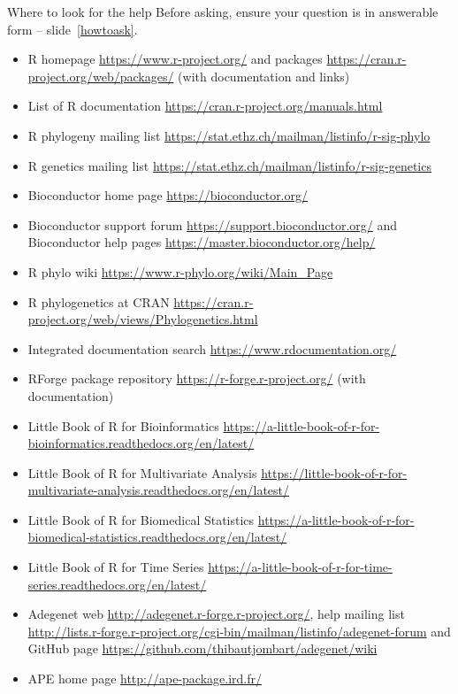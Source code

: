 \documentclass[compress, ucs, xelatex, 11pt, xcolor=svgnames,
  hyperref={
    bookmarks=true,
    unicode=true,
    colorlinks=true,
    pdftitle={Molecular data in R},
    plainpages=false,
    pdfauthor={Vojtech Zeisek},
    pdfsubject={Course about phylogeny and evolution in R},
    pdfcreator={XeLaTeX},
    pdfkeywords={R, evolution, phylogeny, molecular data},
    linkcolor=Tomato,
    anchorcolor=SaddleBrown,
    citecolor=Goldenrod,
    filecolor=DarkMagenta,
    menucolor=Sienna,
    urlcolor=DarkTurquoise,
    pdftex},
  url={hyphens, lowtilde} %
  ]{beamer}
\begin{document}
\begin{frame}[allowframebreaks]{Where to look for the help}
  \label{help}
  Before asking, \alert{ensure your question is in answerable form} -- slide~\ref{howtoask}.
  \begin{itemize}
    \item R homepage \url{https://www.r-project.org/} and packages \url{https://cran.r-project.org/web/packages/} (with documentation and links)
    \item List of R documentation \url{https://cran.r-project.org/manuals.html}
    \item R phylogeny mailing list \url{https://stat.ethz.ch/mailman/listinfo/r-sig-phylo}
    \item R genetics mailing list \url{https://stat.ethz.ch/mailman/listinfo/r-sig-genetics}
    \item Bioconductor home page \url{https://bioconductor.org/}
    \item Bioconductor support forum \url{https://support.bioconductor.org/} and Bioconductor help pages \url{https://master.bioconductor.org/help/}
    \item R phylo wiki \url{https://www.r-phylo.org/wiki/Main_Page}
    \item R phylogenetics at CRAN \url{https://cran.r-project.org/web/views/Phylogenetics.html}
    \item Integrated documentation search \url{https://www.rdocumentation.org/}
    \item RForge package repository \url{https://r-forge.r-project.org/} (with documentation)
    \item Little Book of R for Bioinformatics \url{https://a-little-book-of-r-for-bioinformatics.readthedocs.org/en/latest/}
    \item Little Book of R for Multivariate Analysis \url{https://little-book-of-r-for-multivariate-analysis.readthedocs.org/en/latest/}
    \item Little Book of R for Biomedical Statistics \url{https://a-little-book-of-r-for-biomedical-statistics.readthedocs.org/en/latest/}
    \item Little Book of R for Time Series \url{https://a-little-book-of-r-for-time-series.readthedocs.org/en/latest/}
    \item Adegenet web \url{http://adegenet.r-forge.r-project.org/}, help mailing list \url{http://lists.r-forge.r-project.org/cgi-bin/mailman/listinfo/adegenet-forum} and GitHub page \url{https://github.com/thibautjombart/adegenet/wiki}
    \item APE home page \url{http://ape-package.ird.fr/}

\end{itemize}
\end{frame}
\end{document}
